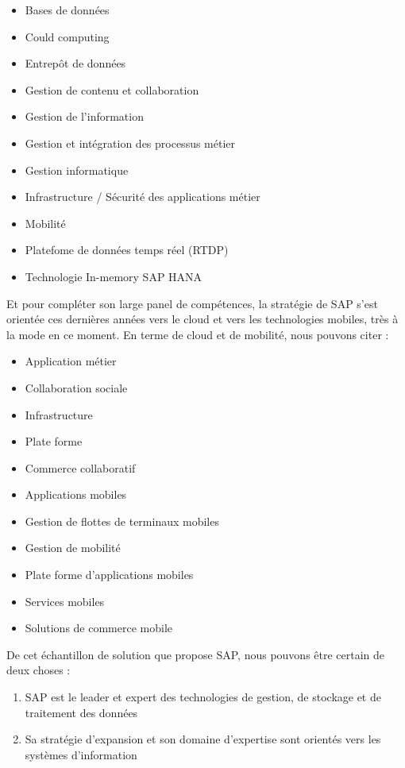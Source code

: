 \begin{itemize}
	\item Bases de données
	\item Could computing
	 \item Entrepôt de données
	 \item Gestion de contenu et collaboration
	 \item Gestion de l'information
	 \item Gestion et intégration des processus métier
	 \item Gestion informatique
	 \item Infrastructure / Sécurité des applications métier
	 \item Mobilité
	 \item Platefome de données temps réel (RTDP)
	 \item Technologie In-memory SAP HANA
\end{itemize}

Et pour compléter son large panel de compétences, la stratégie de SAP s'est orientée ces dernières années vers le cloud et vers les technologies mobiles, très à la mode en ce moment. En terme de cloud et de mobilité, nous pouvons citer :
\begin{itemize}
	\item Application métier
	\item Collaboration sociale
	\item Infrastructure
	\item Plate forme
	\item Commerce collaboratif
	\item Applications mobiles
	\item Gestion de flottes de terminaux mobiles
	\item Gestion de mobilité
	\item Plate forme d'applications mobiles
	\item Services mobiles
	\item Solutions de commerce mobile
\end{itemize}

De cet échantillon de solution que propose SAP, nous pouvons être certain de deux choses :
\begin{enumerate}
	\item SAP est le leader et expert des technologies de gestion, de stockage et de traitement des données
	\item Sa stratégie d'expansion et son domaine d'expertise sont orientés vers les systèmes d'information
\end{enumerate}

